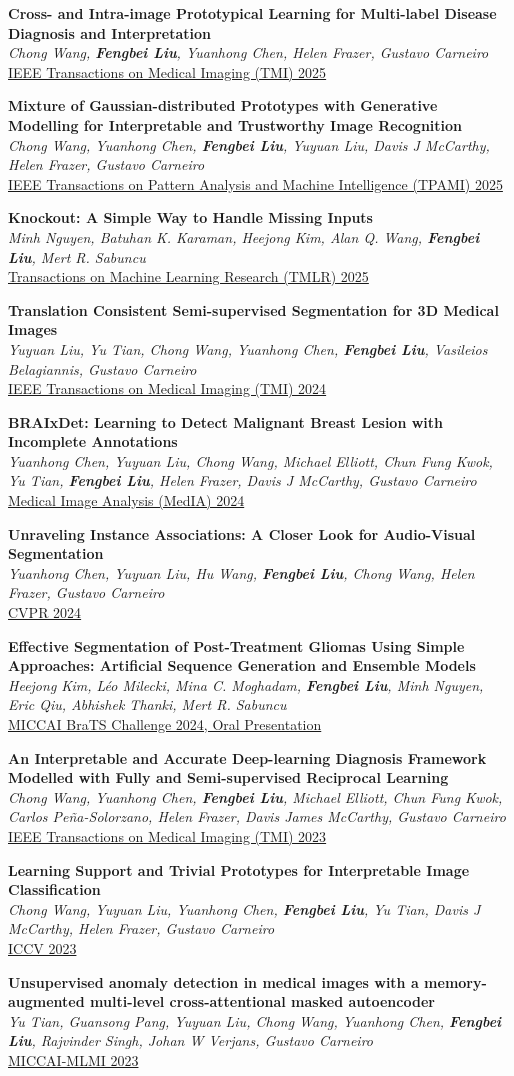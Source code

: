 \documentclass[letterpaper,11pt]{article}
\newcommand{\resumePubheading}[3]{
  \vspace{-2pt} \item\small{
    {\textbf{#1} \vspace{-2pt}}\\
    {\textit{\small#2}}\\ 
    \underline{\small#3}
  }
}
\begin{document}
    \resumePubheading{Cross- and Intra-image Prototypical Learning for Multi-label Disease Diagnosis and Interpretation}{Chong Wang, \textbf{Fengbei Liu}, Yuanhong Chen, Helen Frazer, Gustavo Carneiro}{IEEE Transactions on Medical Imaging (TMI) 2025}
    \resumePubheading{Mixture of Gaussian-distributed Prototypes with Generative Modelling for Interpretable and Trustworthy Image Recognition}{Chong Wang, Yuanhong Chen, \textbf{Fengbei Liu}, Yuyuan Liu, Davis J McCarthy, Helen Frazer, Gustavo Carneiro}{IEEE Transactions on Pattern Analysis and Machine Intelligence (TPAMI) 2025}
    \resumePubheading{Knockout: A Simple Way to Handle Missing Inputs}{Minh Nguyen, Batuhan K. Karaman, Heejong Kim, Alan Q. Wang, \textbf{Fengbei Liu}, Mert R. Sabuncu}{Transactions on Machine Learning Research (TMLR) 2025}
    \resumePubheading{Translation Consistent Semi-supervised Segmentation for 3D Medical Images}{Yuyuan Liu, Yu Tian, Chong Wang, Yuanhong Chen, \textbf{Fengbei Liu}, Vasileios Belagiannis, Gustavo Carneiro}{IEEE Transactions on Medical Imaging (TMI) 2024}
    \resumePubheading{BRAIxDet: Learning to Detect Malignant Breast Lesion with Incomplete Annotations}{Yuanhong Chen, Yuyuan Liu, Chong Wang, Michael Elliott, Chun Fung Kwok, Yu Tian, \textbf{Fengbei Liu}, Helen Frazer, Davis J McCarthy, Gustavo Carneiro}{Medical Image Analysis (MedIA) 2024}
    \resumePubheading{Unraveling Instance Associations: A Closer Look for Audio-Visual Segmentation}{Yuanhong Chen, Yuyuan Liu, Hu Wang, \textbf{Fengbei Liu}, Chong Wang, Helen Frazer, Gustavo Carneiro}{CVPR 2024}
    \resumePubheading{Effective Segmentation of Post-Treatment Gliomas Using Simple Approaches: Artificial Sequence Generation and Ensemble Models}{Heejong Kim, L\'eo Milecki, Mina C. Moghadam, \textbf{Fengbei Liu}, Minh Nguyen, Eric Qiu, Abhishek Thanki, Mert R. Sabuncu}{MICCAI BraTS Challenge 2024, Oral Presentation}
    \resumePubheading{An Interpretable and Accurate Deep-learning Diagnosis Framework Modelled with Fully and Semi-supervised Reciprocal Learning}{Chong Wang, Yuanhong Chen, \textbf{Fengbei Liu}, Michael Elliott, Chun Fung Kwok, Carlos Peña-Solorzano, Helen Frazer, Davis James McCarthy, Gustavo Carneiro}{IEEE Transactions on Medical Imaging (TMI) 2023}
    \resumePubheading{Learning Support and Trivial Prototypes for Interpretable Image Classification}{Chong Wang, Yuyuan Liu, Yuanhong Chen, \textbf{Fengbei Liu}, Yu Tian, Davis J McCarthy, Helen Frazer, Gustavo Carneiro}{ICCV 2023}
    \resumePubheading{Unsupervised anomaly detection in medical images with a memory-augmented multi-level cross-attentional masked autoencoder}{Yu Tian, Guansong Pang, Yuyuan Liu, Chong Wang, Yuanhong Chen, \textbf{Fengbei Liu}, Rajvinder Singh, Johan W Verjans, Gustavo Carneiro}{MICCAI-MLMI 2023}
\end{document}

